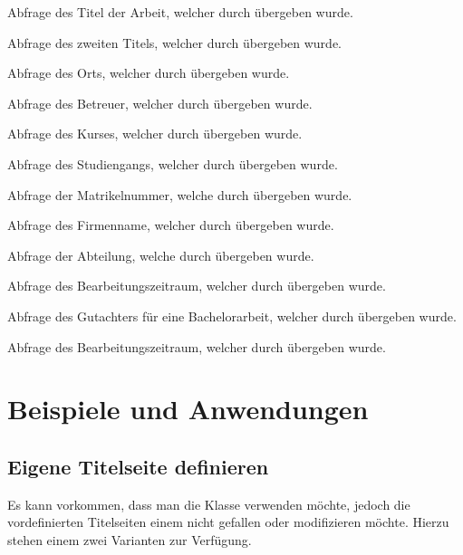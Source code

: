 \documentclass[babel=ngerman,highlight=false]{skdoc}
\begin{document}
            \DescribeMacro\getThesisTitle Abfrage des Titel der Arbeit, welcher durch  übergeben wurde.

            \DescribeMacro\getThesisSecondTitle Abfrage des zweiten Titels, welcher durch  übergeben wurde.

            \DescribeMacro\getLocation Abfrage des Orts, welcher durch  übergeben wurde.

            \DescribeMacro\getSupervisor Abfrage des Betreuer, welcher durch  übergeben wurde.

            \DescribeMacro\getCourseId Abfrage des Kurses, welcher durch  übergeben wurde.

            \DescribeMacro\getCourseName Abfrage des Studiengangs, welcher durch  übergeben wurde.

            \DescribeMacro\getStudentId Abfrage der Matrikelnummer, welche durch  übergeben wurde.

            \DescribeMacro\getInstitute Abfrage des Firmenname, welcher durch  übergeben wurde.

            \DescribeMacro\getInstituteSection Abfrage der Abteilung, welche durch  übergeben wurde.

            \DescribeMacro\getProcessingPeriod Abfrage des Bearbeitungszeitraum, welcher durch  übergeben wurde.

            \DescribeMacro\getReviewer Abfrage des Gutachters für eine Bachelorarbeit, welcher durch  übergeben wurde.

            \DescribeMacro\getBachelorDegree Abfrage des Bearbeitungszeitraum, welcher durch  übergeben wurde.

    \section{Beispiele und Anwendungen}
        \subsection{Eigene Titelseite definieren}
            Es kann vorkommen, dass man die Klasse verwenden möchte, jedoch die vordefinierten Titelseiten einem nicht gefallen oder modifizieren möchte. Hierzu stehen einem zwei Varianten zur Verfügung.
\end{document}
